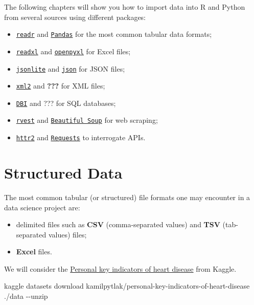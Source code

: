 \documentclass[
  letterpaper,
  DIV=11,
  numbers=noendperiod]{scrreprt}
\newenvironment{Shaded}{\begin{snugshade}}{\end{snugshade}}
\newcommand{\AttributeTok}[1]{\textcolor[rgb]{0.40,0.46,0.14}{#1}}
\newcommand{\ExtensionTok}[1]{\textcolor[rgb]{0.00,0.46,0.62}{#1}}
\newcommand{\NormalTok}[1]{\textcolor[rgb]{0.00,0.46,0.62}{#1}}
\providecommand{\tightlist}{%
  \setlength{\itemsep}{0pt}\setlength{\parskip}{0pt}}
\begin{document}
The following chapters will show you how to import data into R and
Python from several sources using different packages:

\begin{itemize}
\tightlist
\item
  \href{https://readr.tidyverse.org/}{\texttt{readr}} and
  \href{https://pandas.pydata.org/}{\texttt{Pandas}} for the most common
  tabular data formats;
\item
  \href{}{\texttt{readxl}} and \href{}{\texttt{openpyxl}} for Excel
  files;
\item
  \href{https://CRAN.R-project.org/package=jsonlite}{\texttt{jsonlite}}
  and \href{https://docs.python.org/3/library/json.html}{\texttt{json}}
  for JSON files;
\item
  \href{https://xml2.r-lib.org/}{\texttt{xml2}} and \textbf{???} for XML
  files;
\item
  \href{}{\texttt{DBI}} and ??? for SQL databases;
\item
  \href{https://rvest.tidyverse.org/}{\texttt{rvest}} and
  \href{https://www.crummy.com/software/BeautifulSoup/bs4/doc/}{\texttt{Beautiful\ Soup}}
  for web scraping;
\item
  \href{https://httr2.r-lib.org/}{\texttt{httr2}} and
  \href{https://docs.python-requests.org/en/master/}{\texttt{Requests}}
  to interrogate APIs.
\end{itemize}

\hypertarget{structured-data}{%
\chapter{Structured Data}\label{structured-data}}

The most common tabular (or structured) file formats one may encounter
in a data science project are:

\begin{itemize}
\tightlist
\item
  delimited files such as \textbf{CSV} (comma-separated values) and
  \textbf{TSV} (tab-separated values) files;
\item
  \textbf{Excel} files.
\end{itemize}

We will consider the
\href{https://www.kaggle.com/kamilpytlak/personal-key-indicators-of-heart-disease}{Personal
key indicators of heart disease} from Kaggle.

\begin{Shaded}
\begin{Highlighting}[]
\ExtensionTok{kaggle}\NormalTok{ datasets download kamilpytlak/personal{-}key{-}indicators{-}of{-}heart{-}disease ./data }\AttributeTok{{-}{-}unzip}
\end{Highlighting}
\end{Shaded}
\end{document}
